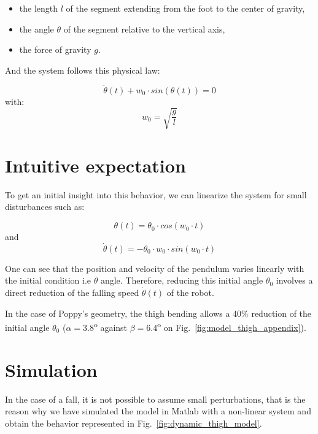 \begin{itemize}
    \item the length $l$ of the segment extending from the foot to the center of gravity,
    \item the angle $\theta$ of the segment relative to the vertical axis,
    \item the force of gravity $g$.
\end{itemize}

And the system follows this physical law:

\begin{equation}
    \ddot{\theta}(t) + w_0 \cdot sin(\theta(t)) = 0
\end{equation}
with:
\begin{equation}
    w_0 = \sqrt{\frac{g}{l}}
\end{equation}

\section{Intuitive expectation} %

To get an initial insight into this behavior, we can linearize the system for small disturbances such as:

\begin{equation}
    \theta(t) = \theta_0 \cdot cos(w_0\cdot t)
\end{equation}
and
\begin{equation}
    \dot{\theta}(t) = -\theta_0 \cdot w_0 \cdot sin(w_0\cdot t)
\end{equation}

One can see that the position and velocity of the pendulum varies linearly with the initial condition i.e $\theta$ angle. Therefore, reducing this initial angle $\theta_0$ involves a direct reduction of the falling speed $\dot{\theta}(t)$ of the robot.

In the case of Poppy's geometry, the thigh bending allows a 40\% reduction of the initial angle $\theta_0$ ($\alpha = 3.8$\textsuperscript{o} against $ \beta = 6.4$\textsuperscript{o} on Fig.~\ref{fig:model_thigh_appendix}).

\section{Simulation} %

In the case of a fall, it is not possible to assume small perturbations, that is the reason why we have simulated the model in Matlab with a non-linear system and obtain the behavior represented in Fig.~\ref{fig:dynamic_thigh_model}.

